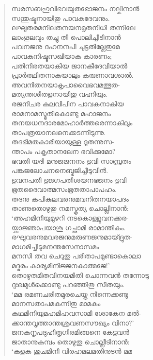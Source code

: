 \begin{verse}
സരസബഹുവിഭവയുതഭോജനം നല്കിനാന്‍\\
സന്തുഷ്ടനായിതു പാവകദേവനും.\\
ലഘുതരമനിലതനയനമൃതനിധി തന്നിലേ\\
ലാംഗൂലവും തച്ചു തീ പൊലിച്ചീടിനാന്‍\\
പവനജനു ദഹനനപി ചുട്ടതില്ലേതുമേ\\
പാവകനിഷ്ടസഖിയാക കാരണം;\\
പതിനിരതയാകിയ ജാനകീദേവിയാല്‍\\
പ്രാര്‍ത്ഥിതനാകയാലും കരുണാവശാല്‍.\\
അവനിതനയാകൃപാവൈഭവമത്ഭുത-\\
മത്യന്തശീതളനായിതു വഹ്നിയും.\\
രജനിചര കുലവിപിന പാവകനാകിയ\\
രാമനാമസ്മൃതികൊണ്ടു മഹാജനം\\
തനയധനദാരമോഹാര്‍ത്തരെന്നാകിലും\\
താപത്രയാനലനെക്കടന്നീടുന്നു.\\
തദഭിമതകാരിയായുള്ള ദൂതന്നുസ-\\
ന്താപം പകൃതാനലേന ഭവിക്കുമോ?\\
ഭവതി യദി മനുജജനനം ഭുവി സാമ്പ്രതം\\
പങ്കജലോചനനെബ്ഭജിച്ചീടുവിന്‍.\\
ഭുവനപതി ഭുജഗപതിശയനഭജനം ഭുവി\\
ഭൂതദൈവാത്മസംഭൂതതാപാപഹം.\\
തദനു കപികുലവരനുമവനിതനയാപദം\\
താണുതൊഴുതു നമസ്കൃത്യ ചൊല്ലിനാന്‍:\\
‘അഹമിനിയുമുഴറി നടകൊള്ളുവനക്കര-\\
യ്ക്കാജ്ഞാപയാശു ഗച്ഛാമി രാമാന്തികം.\\
രഘുവരനുമവരജനുമരുണജനുമായ്ദ്രുത-\\
മാഗമിച്ചീടുമനന്തസേനാസമം\\
മനസി തവ ചെറുതു പരിതാപമുണ്ടാകൊലാ\\
മദ്ഭരം കാര്യമിനിജ്ജനകാത്മജേ!’\\
തൊഴുതമിതവിനയമിതി ചൊന്നവന്‍ തന്നോടു\\
ദുഃഖമുള്‍ക്കൊണ്ടു പറഞ്ഞിതു സീതയും.\\
‘മമ രമണചരിതമുരചെയ്ത നിന്നെക്കണ്ടു\\
മാനസതാപമകന്നിതു മാമകം\\
കഥമിനിയുമഹമിഹവസാമി ശോകേന മല്‍-\\
ക്കാന്തവൃത്താന്തശ്രവണസൗഖ്യം വിനാ?’\\
ജനകനൃപദുഹിതൃഗിരമിങ്ങനെ കേട്ടവന്‍\\
ജാതാനുകമ്പം തൊഴുതു ചൊല്ലീടിനാന്‍:\\
‘കളക ശുചമിനി വിരഹമലമതിനുടന്‍ മമ\\

\end{verse}
